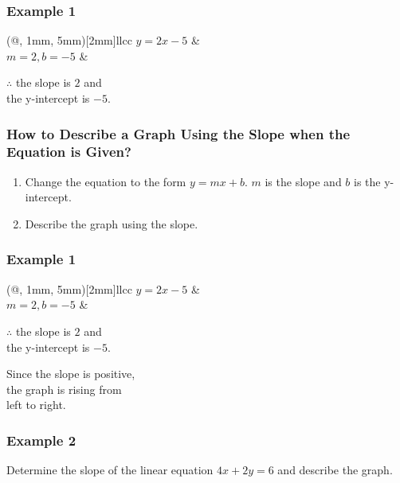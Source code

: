 \documentclass[14pt]{beamer}
\begin{document}
    \begin{frame}
    	\frametitle{Example 1}
    	    	
    	\begin{TAB}(@, 1mm, 5mm)[2mm]{ll}{cc}
    		$ y = 2x - 5 $  &  \\
    		 		
    		\pause  $ m = 2, b = -5 $ & \\
    	\end{TAB}
    	
    	\pause $ \therefore $ the slope is $ 2 $ and \\ the y-intercept is $ -5 $.
    \end{frame}

    \begin{frame}
    	\frametitle{How to Describe a Graph Using the Slope when the Equation is Given?}
    	\begin{enumerate}  
    		\item Change the equation to the form $ y = mx + b $. $ m $ is the slope and $ b $ is the y-intercept.
    		\item Describe the graph using the slope.
    	\end{enumerate}  
    \end{frame}

    \begin{frame}
    	\frametitle{Example 1}
    	
    	\begin{TAB}(@, 1mm, 5mm)[2mm]{ll}{cc}
    		$ y = 2x - 5 $  &  \\
    		
    		$ m = 2, b = -5 $ & \\
    	\end{TAB}
    	
    	$ \therefore $ the slope is $ 2 $ and \\ the y-intercept is $ -5 $.
    	
    	\vone
    	
    	\pause Since the slope is positive, \\ the graph is rising from\\ left to right.
    	
    	\pause {}
    \end{frame}

    \begin{frame}
    	\frametitle{Example 2}
    	Determine the slope of the linear equation $ 4x + 2y = 6 $ and describe the graph.
    \end{frame}
    
\end{document}
